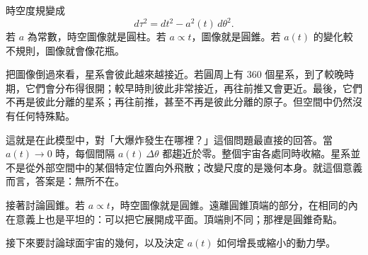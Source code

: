 時空度規變成
\begin{equation}
d\tau^2=dt^2-a^2(t)\,d\theta^2.
\end{equation}
若 \(a\) 為常數，時空圖像就是圓柱。若 \(a\propto t\)，圖像就是圓錐。若 \(a(t)\) 的變化較不規則，圖像就會像花瓶。

把圖像倒過來看，星系會彼此越來越接近。若圓周上有 \(360\) 個星系，到了較晚時期，它們會分布得很開；較早時則彼此非常接近，再往前推又會更近。最後，它們不再是彼此分離的星系；再往前推，甚至不再是彼此分離的原子。但空間中仍然沒有任何特殊點。

這就是在此模型中，對「大爆炸發生在哪裡？」這個問題最直接的回答。當 \(a(t)\to 0\) 時，每個間隔 \(a(t)\,\Delta\theta\) 都趨近於零。整個宇宙各處同時收縮。星系並不是從外部空間中的某個特定位置向外飛散；改變尺度的是幾何本身。就這個意義而言，答案是：無所不在。

\begin{classroomqa}
\end{classroomqa}

接著討論圓錐。若 \(a\propto t\)，時空圖像就是圓錐。遠離圓錐頂端的部分，在相同的內在意義上也是平坦的：可以把它展開成平面。頂端則不同；那裡是圓錐奇點。

接下來要討論球面宇宙的幾何，以及決定 \(a(t)\) 如何增長或縮小的動力學。
